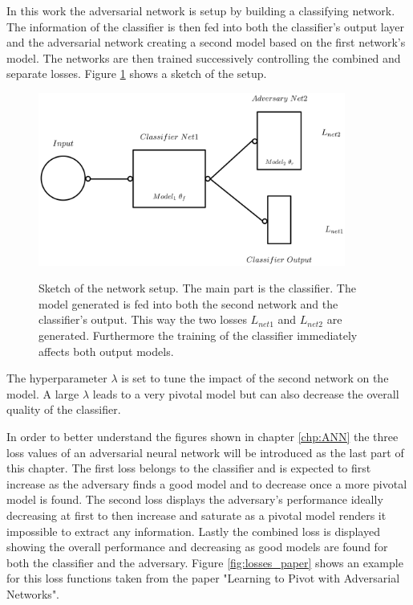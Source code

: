 In this work the adversarial network is setup by building a classifying network. The information of the classifier is then fed into both the classifier's output layer and the adversarial network creating a second model based on the first network's model. The networks are then trained successively controlling the combined and separate losses. Figure \ref{fig:ANN_sketch} shows a sketch of the setup.

\begin{figure}[htbp]
	\centering
	\includegraphics[width=0.9\textwidth]{figures_ML/ANN_sketch.png}
	\label{fig:ANN_sketch}
	\caption[Adversarial setup sketched]{Sketch of the network setup. The main part is the classifier. The model generated is fed into both the second network and the classifier's output. This way the two losses $L_{net1}$ and $L_{net2}$ are generated. Furthermore the training of the classifier immediately affects both output models.}
\end{figure}

The hyperparameter $\lambda$ is set to tune the impact of the second network on the model. A large $\lambda$ leads to a very pivotal model but can also decrease the overall quality of the classifier.

In order to better understand the figures shown in chapter \ref{chp:ANN} the three loss values of an adversarial neural network will be introduced as the last part of this chapter.
The first loss belongs to the classifier and is expected to first increase as the adversary finds a good model and to decrease once a more pivotal model is found. 
The second loss displays the adversary's performance ideally decreasing at first to then increase and saturate as a pivotal model renders it impossible to extract any information.
Lastly the combined loss is displayed showing the overall performance and decreasing as good models are found for both the classifier and the adversary.
Figure \ref{fig:losses_paper} shows an example for this loss functions taken from the paper "Learning to Pivot with Adversarial Networks".~\cite{Louppe:2016ylz}

